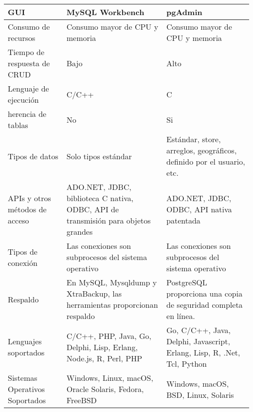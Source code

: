 \begin{longtable}{|p{5cm}|p{5cm}|p{5cm}|}
    \hline \hline
    \endlastfoot
    GUI                                            & MySQL Workbench                                                                   & pgAdmin                                                                 \\\hline
    Consumo de recursos                            & Consumo mayor de CPU y memoria                                                    & Consumo mayor de CPU y memoria                                          \\\hline
    Tiempo de respuesta de CRUD                    & Bajo                                                                              & Alto                                                                    \\\hline
    Lenguaje de ejecución                          & C/C++                                                                             & C                                                                       \\\hline
    herencia de tablas                             & No                                                                                & Si                                                                      \\\hline
    Tipos de datos                                 & Solo tipos estándar                                                               & Estándar, store, arreglos, geográficos, definido por el usuario, etc.   \\\hline
    APIs y otros métodos de acceso                 & ADO.NET, JDBC, biblioteca C nativa, ODBC, API de transmisión para objetos grandes & ADO.NET, JDBC, ODBC, API nativa patentada                               \\\hline
    Tipos de conexión                              & Las conexiones son subprocesos del sistema operativo                              & Las conexiones son subprocesos del sistema operativo                    \\\hline
    Respaldo                                       & En MySQL, Mysqldump y XtraBackup, las herramientas proporcionan respaldo          & PostgreSQL proporciona una copia de seguridad completa en línea.        \\\hline
    Lenguajes soportados                           & C/C++, PHP, Java, Go, Delphi, Lisp, Erlang, Node.js, R, Perl, PHP                 & Go, C/C++, Java, Delphi, Javascript, Erlang, Lisp, R, .Net, Tcl, Python \\\hline
    Sistemas Operativos Soportados                 & Windows, Linux, macOS, Oracle Solaris, Fedora, FreeBSD                            & Windows, macOS, BSD, Linux, Solaris                                     \\
\end{longtable}